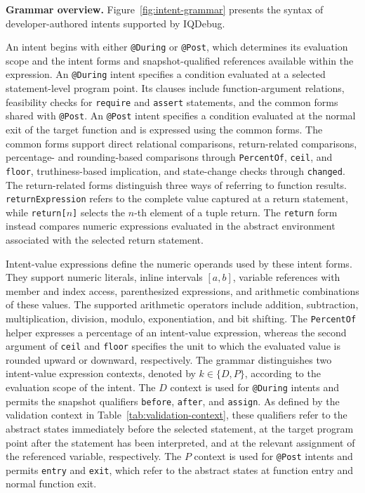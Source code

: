 \documentclass[11pt,oneside]{report}
\theoremstyle{plain}
\theoremstyle{definition}
\theoremstyle{remark}
\begin{document}
\smallskip
\noindent\textbf{Grammar overview.}
Figure~\ref{fig:intent-grammar} presents the syntax of developer-authored intents supported by IQDebug.

An intent begins with either \texttt{@During} or \texttt{@Post}, which determines its evaluation scope and the intent forms and snapshot-qualified references available within the expression.
An \texttt{@During} intent specifies a condition evaluated at a selected statement-level program point.
Its clauses include function-argument relations, feasibility checks for \texttt{require} and \texttt{assert} statements, and the common forms shared with \texttt{@Post}.
An \texttt{@Post} intent specifies a condition evaluated at the normal exit of the target function and is expressed using the common forms.
The common forms support direct relational comparisons, return-related comparisons, percentage- and rounding-based comparisons through \texttt{PercentOf}, \texttt{ceil}, and \texttt{floor}, truthiness-based implication, and state-change checks through \texttt{changed}.
The return-related forms distinguish three ways of referring to function results.
\texttt{returnExpression} refers to the complete value captured at a return statement, while \texttt{return[$n$]} selects the \(n\)-th element of a tuple return.
The \texttt{return} form instead compares numeric expressions evaluated in the abstract environment associated with the selected return statement.

Intent-value expressions define the numeric operands used by these intent forms.
They support numeric literals, inline intervals \([a,b]\), variable references with member and index access, parenthesized expressions, and arithmetic combinations of these values.
The supported arithmetic operators include addition, subtraction, multiplication, division, modulo, exponentiation, and bit shifting.
The \texttt{PercentOf} helper expresses a percentage of an intent-value expression, whereas the second argument of \texttt{ceil} and \texttt{floor} specifies the unit to which the evaluated value is rounded upward or downward, respectively.
The grammar distinguishes two intent-value expression contexts, denoted by \(k \in \{D,P\}\), according to the evaluation scope of the intent.
The \(D\) context is used for \texttt{@During} intents and permits the snapshot qualifiers \texttt{before}, \texttt{after}, and \texttt{assign}.
As defined by the validation context in Table~\ref{tab:validation-context}, these qualifiers refer to the abstract states immediately before the selected statement, at the target program point after the statement has been interpreted, and at the relevant assignment of the referenced variable, respectively.
The \(P\) context is used for \texttt{@Post} intents and permits \texttt{entry} and \texttt{exit}, which refer to the abstract states at function entry and normal function exit.
\end{document}

